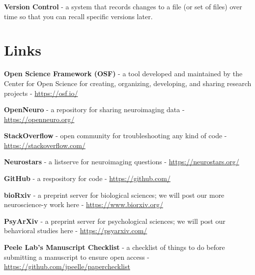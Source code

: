 \documentclass[]{book}
\begin{document}
\textbf{Version Control} - a system that records changes to a file (or set of files) over time so that you can recall specific versions later.

\hypertarget{links}{%
\section{Links}\label{links}}

\textbf{Open Science Framework (OSF)} - a tool developed and maintained by the Center for Open Science for creating, organizing, developing, and sharing research projects - \url{https://osf.io/}

\textbf{OpenNeuro} - a repository for sharing neuroimaging data - \url{https://openneuro.org/}

\textbf{StackOverflow} - open community for troubleshooting any kind of code - \url{https://stackoverflow.com/}

\textbf{Neurostars} - a listserve for neuroimaging questions - \url{https://neurostars.org/}

\textbf{GitHub} - a respository for code - \url{https://github.com/}

\textbf{bioRxiv} - a preprint server for biological sciences; we will post our more neuroscience-y work here - \url{https://www.biorxiv.org/}

\textbf{PsyArXiv} - a preprint server for psychological sciences; we will post our behavioral studies here - \url{https://psyarxiv.com/}

\textbf{Peele Lab's Manuscript Checklist} - a checklist of things to do before submitting a manuscript to ensure open access - \url{https://github.com/jpeelle/paperchecklist}


\end{document}
